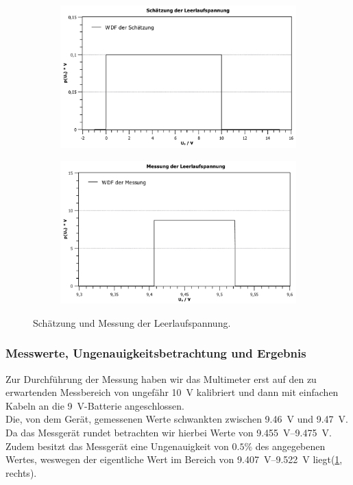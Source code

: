 \documentclass[11pt,a4paper,titlepage, ngerman]{article}
\begin{document}
				\begin{figure}	
					\begin{subfigure}{0.45\textwidth}
						\centering
						\includegraphics[scale=0.3]{Spannungsschaetzung.pdf}
					\end{subfigure}
					\begin{subfigure}{0.45\textwidth}
						\centering
						\includegraphics[scale=0.3]{Spannungsmessung.pdf}
					\end{subfigure}	
					\caption{Schätzung und Messung der Leerlaufspannung.}
					\label{fig:spannung}
				\end{figure}
			
			\subsubsection{Messwerte, Ungenauigkeitsbetrachtung und Ergebnis}
				\label{2.1.2}
				
				Zur Durchführung der Messung haben wir das Multimeter erst auf den zu erwartenden Messbereich von ungefähr \SI{10}{\V} kalibriert und dann mit einfachen Kabeln an die \SI{9}{\V}-Batterie angeschlossen. \\			
				Die, von dem Gerät, gemessenen Werte schwankten zwischen \SI{9,46}{\V} und \SI{9,47}{\V}.
				Da das Messgerät rundet betrachten wir hierbei Werte von \SIrange{9,455}{9,475}{\V}.
				Zudem besitzt das Messgerät eine Ungenauigkeit von $0.5\%$ des angegebenen Wertes, weswegen der eigentliche Wert im Bereich von \SIrange{9,407}{9,522}{\V} liegt(\ref{fig:spannung}, rechts).
			
\end{document}
